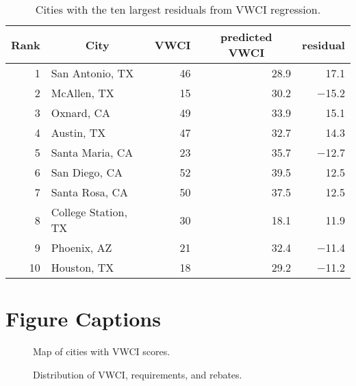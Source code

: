 \documentclass[draft,linenumbers]{agujournal}
\begin{document}
\begin{table}[htbp]
\centering
\caption{Cities with the ten largest residuals from VWCI regression.} 
\label{tab:vwci_top_residuals}
\begin{tabular}{rlrrr}
  \hline
\multicolumn{1}{c}{ Rank } & \multicolumn{1}{c}{ City } & \multicolumn{1}{c}{ VWCI } & \multicolumn{1}{c}{ predicted VWCI } & \multicolumn{1}{c}{ residual } \\ 
  \hline
 1 & San Antonio, TX & 46 & 28.9 & 17.1 \\ 
   2 & McAllen, TX & 15 & 30.2 & $-$15.2 \\ 
   3 & Oxnard, CA & 49 & 33.9 & 15.1 \\ 
   4 & Austin, TX & 47 & 32.7 & 14.3 \\ 
   5 & Santa Maria, CA & 23 & 35.7 & $-$12.7 \\ 
   6 & San Diego, CA & 52 & 39.5 & 12.5 \\ 
   7 & Santa Rosa, CA & 50 & 37.5 & 12.5 \\ 
   8 & College Station, TX & 30 & 18.1 & 11.9 \\ 
   9 & Phoenix, AZ & 21 & 32.4 & $-$11.4 \\ 
  10 & Houston, TX & 18 & 29.2 & $-$11.2 \\ 
   \hline
\end{tabular}
\end{table}


%
%
\clearpage
\section*{Figure Captions}

\begin{figure}[h]
\caption{Map of cities with VWCI scores.}\label{fig:vwci_map}
\end{figure}


\begin{figure}[h]
\caption{Distribution of VWCI, requirements, and rebates.}\label{fig:vwci_histogram}
\end{figure}
\end{document}
